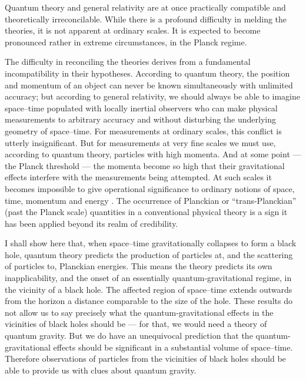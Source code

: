 \documentclass[12pt]{article}
\begin{document}
Quantum theory and general relativity are at once practically compatible and
theoretically irreconcilable.   While there is a profound difficulty in melding
the theories, it is not apparent at ordinary scales.  It is expected to become
pronounced rather in extreme circumstances, in the Planck regime.

The difficulty in reconciling the theories derives from a fundamental
incompatibility in their hypotheses. According to quantum theory, the position
and momentum of an object can never be known simultaneously with unlimited
accuracy; but according to general relativity, we should always be able to
imagine space--time populated with locally inertial observers who can make
physical measurements  to arbitrary accuracy and without disturbing the
underlying geometry of space--time.    For measurements at ordinary scales,
this conflict is utterly insignificant.  But for measurements at very fine
scales we must use, according to quantum theory, particles with high momenta. 
And at some point --- the Planck threshold --- the momenta become so high that
their gravitational effects interfere with the measurements being attempted. 
At such scales it becomes impossible to give operational significance to
ordinary notions of space, time, momentum and energy \cite{DeWitt:1962}. The
occurrence of Planckian or ``trans-Planckian'' (past the Planck scale)
quantities in a conventional physical theory is a sign it has been applied
beyond its realm of credibility.

I shall show here that, when space--time gravitationally collapses to form a
black hole, quantum theory predicts the production of particles at, and the
scattering of particles to, Planckian energies.  This means the theory predicts
its own inapplicability, and the onset of an essentially quantum-gravitational
regime, in the vicinity of a black hole.  The affected region of space--time
extends outwards from the horizon a distance comparable to the size of the
hole. These results do not allow us to say precisely what the
quantum-gravitational effects in the vicinities of black holes should be ---
for that,  we would need a theory of quantum gravity.  But we do have an
unequivocal prediction that the quantum-gravitational effects should be
significant in a substantial volume of space--time.   Therefore observations of
particles from the vicinities of black holes should be able to provide us with
clues about quantum gravity.
\end{document}
